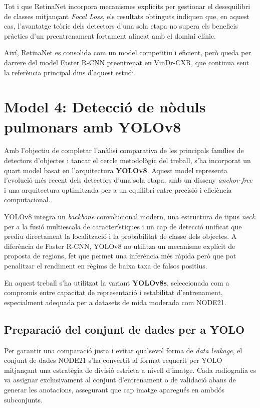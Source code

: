 \documentclass[conference]{IEEEtran}
\begin{document}
Tot i que RetinaNet incorpora mecanismes explícits per gestionar el desequilibri
de classes mitjançant \textit{Focal Loss}, els resultats obtinguts indiquen que,
en aquest cas, l’avantatge teòric dels detectors d’una sola etapa no supera els
beneficis pràctics d’un preentrenament fortament alineat amb el domini clínic.

Així, RetinaNet es consolida com un model competitiu i eficient, però queda per
darrere del model Faster R-CNN preentrenat en VinDr-CXR, que continua sent la
referència principal dins d’aquest estudi.



\section{Model 4: Detecció de nòduls pulmonars amb YOLOv8}

Amb l’objectiu de completar l’anàlisi comparativa de les principals famílies de detectors
d’objectes i tancar el cercle metodològic del treball, s’ha incorporat un quart model
basat en l’arquitectura \textbf{YOLOv8}. Aquest model representa l’evolució més recent
dels detectors d’una sola etapa, amb un disseny \textit{anchor-free} i una arquitectura
optimitzada per a un equilibri entre precisió i eficiència computacional.

YOLOv8 integra un \textit{backbone} convolucional modern, una estructura de tipus
\textit{neck} per a la fusió multiescala de característiques i un cap de detecció unificat
que prediu directament la localització i la probabilitat de classe dels objectes.
A diferència de Faster R-CNN, YOLOv8 no utilitza un mecanisme explícit de proposta de
regions, fet que permet una inferència més ràpida però que pot penalitzar el rendiment
en règims de baixa taxa de falsos positius.

En aquest treball s’ha utilitzat la variant \textbf{YOLOv8s}, seleccionada com a compromís
entre capacitat de representació i estabilitat d’entrenament, especialment adequada per a
datasets de mida moderada com NODE21.

\subsection{Preparació del conjunt de dades per a YOLO}

Per garantir una comparació justa i evitar qualsevol forma de \textit{data leakage},
el conjunt de dades NODE21 s’ha convertit al format requerit per YOLO mitjançant una
estratègia de divisió estricta a nivell d’imatge. Cada radiografia es va assignar
exclusivament al conjunt d’entrenament o de validació abans de generar les anotacions,
assegurant que cap imatge aparegués en ambdós subconjunts.
\end{document}
